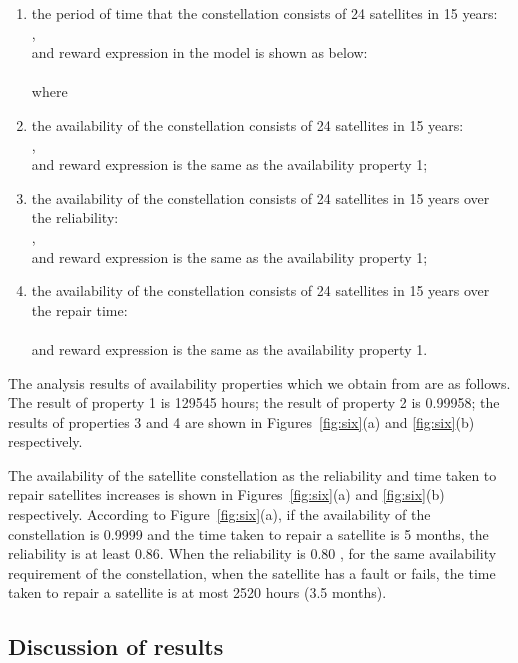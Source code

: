 \documentclass[preprint,12pt]{qrei}
\begin{document}
\begin{enumerate}
\item the period of time that the constellation consists of 24 satellites in 15 years:\\
,\\
and reward expression in the  model is shown as below:\\
\\
 where \\

\item the availability of the constellation consists of 24 satellites in 15 years:\\
,\\
and reward expression is the same as the availability property 1;
\item the availability of the constellation consists of 24 satellites in 15 years over the reliability:\\
,\\
and reward expression is the same as the availability property 1;
\item the availability of the constellation consists of 24 satellites in 15 years over the repair time:\\
\\
and reward expression is the same as the availability property 1.
\end{enumerate}

The analysis results of availability properties which we obtain from  are as follows. The result of property 1 is 129545 hours; the result of property 2 is 0.99958; the results of properties 3 and 4 are shown in Figures~\ref{fig:six}(a) and \ref{fig:six}(b) respectively.

The availability of the satellite constellation as the reliability and time taken to repair satellites increases is shown in Figures~\ref{fig:six}(a) and \ref{fig:six}(b) respectively. According to Figure~\ref{fig:six}(a), if the availability of the constellation is 0.9999 and the time taken to repair a satellite is 5 months, the reliability is at least 0.86. When the reliability is 0.80 , for the same availability requirement of the constellation, when the satellite has a fault or fails, the time taken to repair a satellite is at most 2520 hours (3.5 months).

\subsection{Discussion of results}
\end{document}
